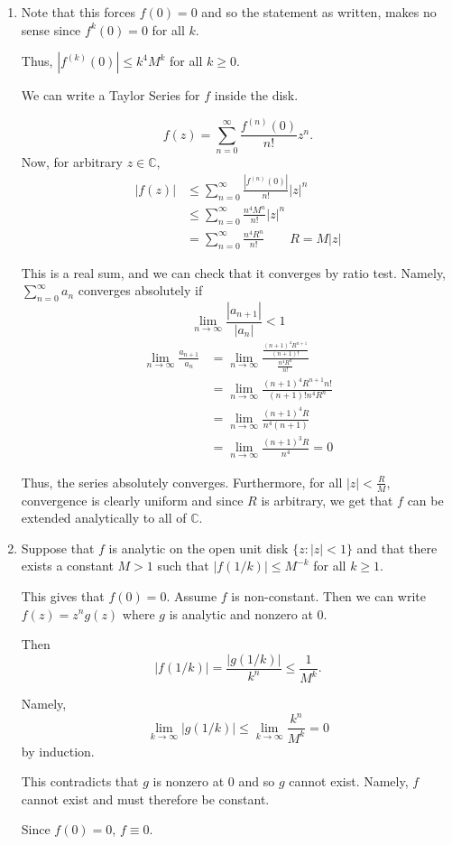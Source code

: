 \documentclass[12pt]{Homework}
\begin{document}
\begin{solution}$\,$
\begin{enumerate}[label=(\alph*)]
    \item Note that this forces $f(0)=0$ and so the statement as written, makes no sense since $f^k(0)=0$ for all $k.$ 
    
    Thus, $|f^{(k)}(0)|\le k^4M^k$ for all $k\ge0.$
    
    We can write a Taylor Series for $f$ inside the disk. 
    
    $$f(z)=\sum_{n=0}^\infty\frac{f^{(n)}(0)}{n!}z^n.$$ Now, for arbitrary $z\in\mathbb{C}$, \begin{align*}
        |f(z)|&\le\sum_{n=0}^\infty\frac{|f^{(n)}(0)|}{n!}|z|^n\\
        &\le\sum_{n=0}^\infty\frac{n^4M^n}{n!}|z|^n\\
        &=\sum_{n=0}^\infty\frac{n^4 R^n}{n!}\qquad R=M|z|
    \end{align*}
    
    This is a real sum, and we can check that it converges by ratio test. Namely, $\sum_{n=0}^\infty a_n$ converges absolutely if $$\lim_{n\to\infty}\frac{|a_{n+1}|}{|a_n|}<1$$ \begin{align*}
        \lim_{n\to\infty}\frac{a_{n+1}}{a_n}&=\lim_{n\to\infty}\frac{\frac{(n+1)^4 R^{n+1}}{(n+1)!}}{\frac{n^4 R^n}{n!}}\\
        &=\lim_{n\to\infty}\frac{(n+1)^4 R^{n+1} n!}{(n+1)!n^4 R^n}\\
        &=\lim_{n\to\infty}\frac{(n+1)^4 R}{n^4(n+1)}\\
        &=\lim_{n\to\infty}\frac{(n+1)^3 R}{n^4}=0
    \end{align*}
    
    Thus, the series absolutely converges. Furthermore, for all $|z|<\frac{R}{M}$, convergence is clearly uniform and since $R$ is arbitrary, we get that $f$ can be extended analytically to all of $\mathbb{C}$. 

    \item Suppose that $f$ is analytic on the open unit disk $\{z:|z|<1\}$ and that there exists a constant $M>1$ such that $|f(1/k)|\le M^{-k}$ for all $k\ge1$. 

    This gives that $f(0)=0$. Assume $f$ is non-constant. Then we can write $f(z)=z^ng(z)$ where $g$ is analytic and nonzero at $0$.
    
    Then $$|f(1/k)|=\frac{|g(1/k)|}{k^n}\le\frac{1}{M^k}.$$
    
    Namely, $$\lim_{k\to\infty}|g(1/k)|\le\lim_{k\to\infty}\frac{k^n}{M^k}=0$$ by induction. 
    
    This contradicts that $g$ is nonzero at $0$ and so $g$ cannot exist. Namely, $f$ cannot exist and must therefore be constant.
    
    Since $f(0)=0$, $f\equiv 0.$
\end{enumerate}
\end{solution}
\end{document}

